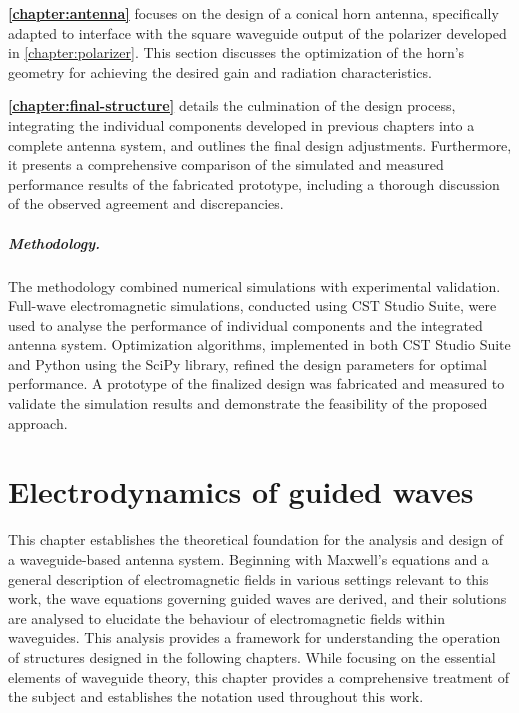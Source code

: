 \documentclass[11pt,a4paper,twoside,openany]{report}
\begin{document}
\textbf{\cref{chapter:antenna}} focuses on the design of a conical horn antenna, specifically adapted to interface with the square waveguide output of the polarizer developed in \cref{chapter:polarizer}. This section discusses the optimization of the horn's geometry for achieving the desired gain and radiation characteristics.

\textbf{\cref{chapter:final-structure}} details the culmination of the design process, integrating the individual components developed in previous chapters into a complete antenna system, and outlines the final design adjustments. Furthermore, it presents a comprehensive comparison of the simulated and measured performance results of the fabricated prototype, including a thorough discussion of the observed agreement and discrepancies.

\paragraph*{Methodology.} The methodology combined numerical simulations with experimental validation. Full-wave electromagnetic simulations, conducted using CST Studio Suite, were used to analyse the performance of individual components and the integrated antenna system. Optimization algorithms, implemented in both CST Studio Suite and Python using the SciPy library, refined the design parameters for optimal performance. A prototype of the finalized design was fabricated and measured to validate the simulation results and demonstrate the feasibility of the proposed approach.


\chapter{Electrodynamics of guided waves}
\label{chapter:electrodynamics}
This chapter establishes the theoretical foundation for the analysis and design of a waveguide-based antenna system. Beginning with Maxwell's equations and a general description of electromagnetic fields in various settings relevant to this work, the wave equations governing guided waves are derived, and their solutions are analysed to elucidate the behaviour of electromagnetic fields within waveguides. This analysis provides a framework for understanding the operation of structures designed in the following chapters. While focusing on the essential elements of waveguide theory, this chapter provides a comprehensive treatment of the subject and establishes the notation used throughout this work.
\end{document}
